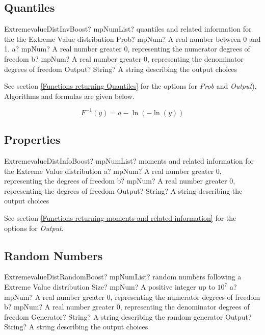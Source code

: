 \subsection{Quantiles}
\begin{mpFunctionsExtract}
	\mpFunctionFourNotImplemented
	{ExtremevalueDistInvBoost? mpNumList? quantiles and related information for the the Extreme Value distribution}
	{Prob? mpNum? A real number between 0 and 1.}
	{a? mpNum? A real number greater 0, representing the numerator  degrees of freedom}
	{b? mpNum? A real number greater 0, representing the denominator degrees of freedom}
	{Output? String? A string describing the output choices}
\end{mpFunctionsExtract}

See section \ref{Functions returning Quantiles} for the options for  {\itshape\sffamily Prob} and {\itshape\sffamily Output}). Algorithms and formulas are given below.

\begin{equation} 
	F^{-1}(y)= a-\ln(-\ln(y))
\end{equation}


\subsection{Properties}
\label{ExtremevalueDistributionProperties}


\begin{mpFunctionsExtract}
	\mpFunctionThreeNotImplemented
	{ExtremevalueDistInfoBoost? mpNumList? moments and related information for the Extreme Value distribution}
	{a? mpNum? A real number greater 0, representing the degrees of freedom}
	{b? mpNum? A real number greater 0, representing the degrees of freedom}
	{Output? String? A string describing the output choices}
\end{mpFunctionsExtract}

\vspace{0.3cm}

See section \ref{Functions returning moments and related information} for the options for {\itshape\sffamily Output}. 




\subsection{Random Numbers}

\begin{mpFunctionsExtract}
	\mpFunctionFiveNotImplemented
	{ExtremevalueDistRandomBoost? mpNumList? random numbers following a Extreme Value distribution}
	{Size? mpNum? A positive integer up to $10^7$}
	{a? mpNum? A real number greater 0, representing the numerator  degrees of freedom}
	{b? mpNum? A real number greater 0, representing the denominator degrees of freedom}
	{Generator? String? A string describing the random generator}
	{Output? String? A string describing the output choices}
\end{mpFunctionsExtract}

